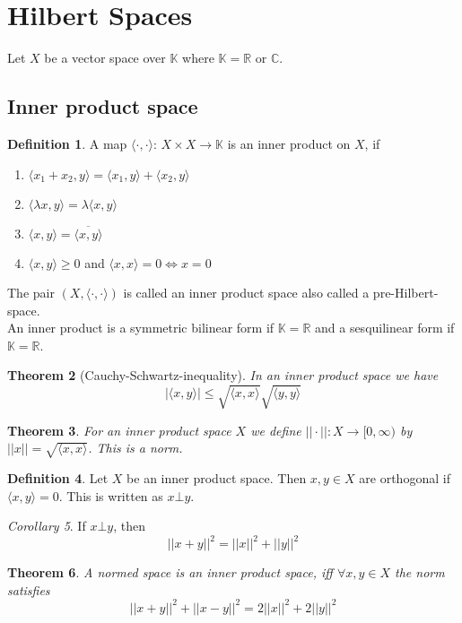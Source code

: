 \documentclass[a4paper, 12pt]{article}
\theoremstyle{plain}
\newtheorem{theorem}{Theorem}[subsection] %
\theoremstyle{definition}
\newtheorem{definition}[theorem]{Definition} %
\theoremstyle{lemma}
\theoremstyle{remark}
\theoremstyle{corollary}
\newtheorem{corollary}[theorem]{Corollary}
\theoremstyle{example}
\begin{document}
\section{Hilbert Spaces}
	Let $X$ be a vector space over $\mathbb{K}$ where $\mathbb{K} = \mathbb{R}$ or $\mathbb{C}$.
	\subsection{Inner product space}
	\begin{definition}
		A map $\langle \cdot , \cdot \rangle$: $X\times X \to \mathbb{K}$ is an inner product on $X$, if \begin{enumerate}
			\item $\langle x_1+x_2, y \rangle = \langle x_1,y\rangle + \langle x_2,y\rangle$
			\item $\langle \lambda x,y\rangle = \lambda \langle x,y\rangle$
			\item $\langle x,y\rangle = \overline{\langle x,y\rangle}$
			\item $\langle x,y\rangle \geq 0$ and $\langle x,x\rangle = 0 \Leftrightarrow x=0$
		\end{enumerate}
		The pair $(X, \langle\cdot,\cdot\rangle)$ is called an inner product space also called a pre-Hilbert-space.\\
		An inner product is a symmetric bilinear form if $\mathbb{K} = \mathbb{R}$ and a sesquilinear form if $\mathbb{K} = \mathbb{R}$.
	\end{definition}
	\begin{theorem} [Cauchy-Schwartz-inequality]
		In an inner product space we have \[\left|\langle x,y\rangle\right| \leq \sqrt{\langle x,x\rangle} \sqrt{\langle y,y\rangle}\]
	\end{theorem}
	\begin{theorem}
		For an inner product space $X$ we define $||\cdot ||: X \to [0,\infty)$ by $||x|| = \sqrt{\langle x,x\rangle}$. This is a norm.
	\end{theorem}
	\begin{definition}
		Let $X$ be an inner product space. Then $x,y \in X$ are orthogonal if $\langle x,y\rangle = 0$. This is written as $x\bot y$.
	\end{definition}
	\begin{corollary}
		If $x\bot y$, then \[||x+y||^2 = ||x||^2 + ||y||^2\]
	\end{corollary}
	\begin{theorem}
		A normed space is an inner product space, iff $\forall x,y \in X$ the norm satisfies  \[||x+y||^2 + ||x-y||^2 = 2||x||^2 + 2||y||^2\]
	\end{theorem}
\end{document}

